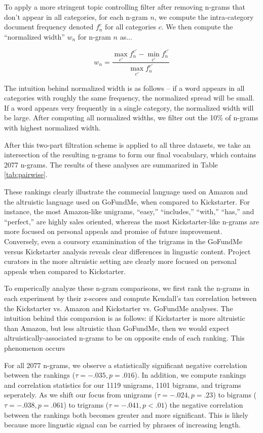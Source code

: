\documentclass[letterpaper]{article}
\begin{document}
To apply a more stringent topic controlling filter after removing n-grams that don't appear in all categories, for each n-gram $n$, we compute the intra-category document frequency denoted $f_n^c$ for all categories $c$. We then compute the ``normalized width'' $w_n$ for n-gram $n$ as...

\begin{equation} \label{eq:spread}
w_n = \frac{\max\limits_{c'}f_n^{c'} - \min\limits_{c'}f_n^{c'}}{\max\limits_{c'}f_n^{c'}}
\end{equation}

The intuition behind normalized width is as follows -- if a word appears in all categories with roughly the same frequency, the normalized spread will be small. If a word appears very frequently in a single category, the normalized width will be large. After computing all normalized widths, we filter out the 10\% of n-grams with highest normalized width.

After this two-part filtration scheme is applied to all three datasets, we take an intersection of the resulting n-grams to form our final vocabulary, which contains 2077 n-grams. The results of these analyses are summarized in Table \ref{tab:pairwise}.

These rankings clearly illustrate the commecial language used on Amazon and the altruistic language used on GoFundMe, when compared to Kickstarter. For instance, the most Amazon-like unigrams, ``easy,'' ``includes,'' ``with,'' ``has,'' and ``perfect,'' are highly sales oriented, whereas the most Kickstarter-like n-grams are more focused on personal appeals and promise of future improvement. Conversely, even a coursory examinination of the trigrams in the GoFundMe versus Kickstarter analysis reveals clear differences in lingustic content. Project curators in the more altruistic setting are clearly more focused on personal appeals when compared to Kickstarter.

To emperically analyze these n-gram comparisons, we first rank the n-grams in each experiment by their z-scores and compute Kendall's tau correlation between the Kickstarter vs. Amazon and Kickstarter vs. GoFundMe analyses. The intuition behind this comparsion is as follows: if Kickstarter is more altruistic than Amazon, but less altruistic than GoFundMe, then we would expect altruistically-associated n-grams to be on opposite ends of each ranking. This phenomenon occurs 

For all 2077 n-grams, we observe a statistically significant negative correlation between the rankings ($\tau = -.035, p = .016$). In addition, we compute rankings and correlation statistics for our 1119 unigrams, 1101 bigrams, and trigrams seperately. As we shift our focus from unigrams ($\tau = -.024, p = .23$) to bigrams ($\tau = -.038, p = .061$) to trigrams ($\tau = -.041, p < .01$) the negative correlation between the rankings both becomes greater and more significant. This is likely because more lingustic signal can be carried by phrases of increasing length.
\end{document}

